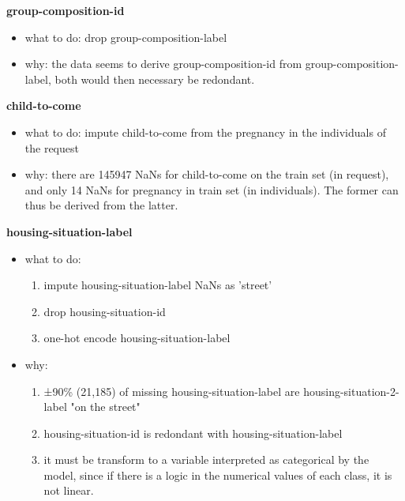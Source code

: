 \documentclass[11pt]{article}
\theoremstyle{definition}
\begin{document}
            \textbf{group-composition-id}
            \begin{itemize}
                \item what to do: drop group-composition-label
                \item why: the data seems to derive group-composition-id from group-composition-label, both would then necessary be redondant.
            \end{itemize}


            \textbf{child-to-come}
            \begin{itemize}
                \item what to do: impute child-to-come from the pregnancy in the individuals of the request
                \item why: there are 145947 NaNs for child-to-come on the train set (in request), and only 14 NaNs for pregnancy in train set (in individuals). The former can thus be derived from the latter.
            \end{itemize}
                       

            \textbf{housing-situation-label}
            \begin{itemize}
                \item what to do:
                \begin{enumerate}
                    \item impute housing-situation-label NaNs as 'street'
                    \item drop housing-situation-id
                    \item one-hot encode housing-situation-label
                \end{enumerate}
                \item why:
                \begin{enumerate}
                    \item ±90\% (21,185) of missing housing-situation-label are housing-situation-2-label "on the street"
                    \item housing-situation-id is redondant with housing-situation-label
                    \item it must be transform to a variable interpreted as categorical by the model, since if there is a logic in the numerical values of each class, it is not linear.
                \end{enumerate}
    
            \end{itemize}
\end{document}
